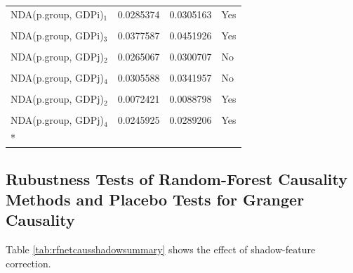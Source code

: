 \documentclass[preprint, 3p,
authoryear]{elsarticle} %
\begin{document}
\begin{longtable}[t]{lrrl}
NDA(p.group, GDPi)$_1$ & 0.0285374 & 0.0305163 & Yes\\
\cellcolor{gray!10}{NDA(p.group, GDPi)$_2$} & \cellcolor{gray!10}{0.0106864} & \cellcolor{gray!10}{0.0138553} & \cellcolor{gray!10}{Yes}\\
NDA(p.group, GDPi)$_3$ & 0.0377587 & 0.0451926 & Yes\\
\cellcolor{gray!10}{NDA(p.group, GDPj)$_1$} & \cellcolor{gray!10}{0.0167341} & \cellcolor{gray!10}{0.0187425} & \cellcolor{gray!10}{No}\\
NDA(p.group, GDPj)$_2$ & 0.0265067 & 0.0300707 & No\\
\cellcolor{gray!10}{NDA(p.group, GDPj)$_3$} & \cellcolor{gray!10}{0.0684429} & \cellcolor{gray!10}{0.0758132} & \cellcolor{gray!10}{No}\\
NDA(p.group, GDPj)$_4$ & 0.0305588 & 0.0341957 & No\\
\cellcolor{gray!10}{NDA(p.group, GDPj)$_1$} & \cellcolor{gray!10}{0.0096111} & \cellcolor{gray!10}{0.0105093} & \cellcolor{gray!10}{Yes}\\
NDA(p.group, GDPj)$_2$ & 0.0072421 & 0.0088798 & Yes\\
\cellcolor{gray!10}{NDA(p.group, GDPj)$_3$} & \cellcolor{gray!10}{0.0554759} & \cellcolor{gray!10}{0.0606837} & \cellcolor{gray!10}{Yes}\\
NDA(p.group, GDPj)$_4$ & 0.0245925 & 0.0289206 & Yes\\*
\end{longtable}
\endgroup{}

\subsection{Rubustness Tests of Random-Forest Causality Methods and
Placebo Tests for Granger Causality}\label{sec:robustness_fdr_placebo}

Table \ref{tab:rfnetcausshadowsummary} shows the effect of
shadow-feature correction.

\begingroup\fontsize{8}{10}\selectfont
\end{document}
